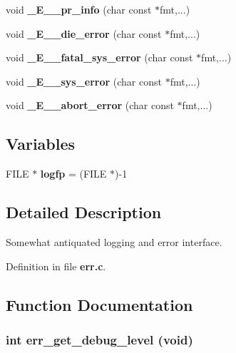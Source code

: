 \begin{CompactItemize}
\item 
void \textbf{\_\-E\_\-\_\-pr\_\-info} (char const $\ast$fmt,...)\label{err_8c_d90268a25147c7485c0b41b1b12783e4}

\item 
void \textbf{\_\-E\_\-\_\-die\_\-error} (char const $\ast$fmt,...)\label{err_8c_d6271835d1ac95bf7d04cf30a148fb79}

\item 
void \textbf{\_\-E\_\-\_\-fatal\_\-sys\_\-error} (char const $\ast$fmt,...)\label{err_8c_dd44119b26798320a43e2eaee0f71a15}

\item 
void \textbf{\_\-E\_\-\_\-sys\_\-error} (char const $\ast$fmt,...)\label{err_8c_9b5c6b51090d5a2aaedf1ab8e43e8f5c}

\item 
void \textbf{\_\-E\_\-\_\-abort\_\-error} (char const $\ast$fmt,...)\label{err_8c_28cf0aaaf44493d5a78dec076d227df4}

\end{CompactItemize}
\subsection*{Variables}
\begin{CompactItemize}
\item 
FILE $\ast$ \textbf{logfp} = (FILE $\ast$)-1\label{err_8c_c16dab5cefce6fed135c20d1bae372a5}

\end{CompactItemize}


\subsection{Detailed Description}
Somewhat antiquated logging and error interface. 



Definition in file {\bf err.c}.

\subsection{Function Documentation}
\subsubsection[{err\_\-get\_\-debug\_\-level}]{\setlength{\rightskip}{0pt plus 5cm}int err\_\-get\_\-debug\_\-level (void)}\label{err_8c_393ad2383651d1fed0223c92208a6631}



